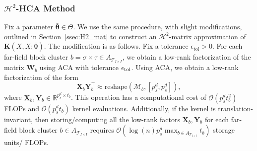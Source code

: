 \documentclass[final,3p,times]{elsarticle}
\newcommand{\mc}[1]{\mathcal{#1}}
\renewcommand{\vec}[1]{\boldsymbol{#1}}
\newcommand{\mat}[1]{\boldsymbol{#1}}
\newcommand{\R}{\mathbb{R}}
\newcommand{\ten}[1]{\boldsymbol{\mathcal{#1}}}
\begin{document}
\subsubsection{\texorpdfstring{$\mc{H}^{2}$}{}-HCA Method}\label{sssec:H2-ACA}
Fix a parameter $\bar{\vec{\theta}} \in \Theta$. We use the same procedure, with slight modifications,  outlined in Section~\ref{ssec:H2_mat} to construct an $\mc{H}^{2}$-matrix approximation of $\mat{K}(X, X;\bar{\vec{\theta}})$. The modification is as follows. Fix a tolerance $\epsilon_{\text{tol}} > 0$. For each far-field block cluster $b = \sigma \times \tau \in A_{\mc{T}_{I \times I}}$,  we obtain a low-rank factorization of the matrix $\mat{W}_{b}$ using ACA with tolerance $\epsilon_{\rm{tol}}$. Using ACA, we obtain a low-rank factorization of the form
$$\mat{X}_{b}\mat{Y}_{b}^{\top} \approx  \text{reshape}(\ten{M}_{b}, [p_s^d, p_s^d]),$$
where $\mat{X}_{b}, \mat{Y}_{b} \in \R^{p_s^d \times t_b}$. This operation has a computational cost of  
  $\mc{O}(p_s^dt_b^2)$ FLOPs and $\mc{O}(p_s^dt_b)$ kernel evaluations. Additionally, if the kernel is translation-invariant, then storing/computing all the low-rank factors $\mat{X}_{b}, \mat{Y}_{b}$ for each far-field block cluster $b \in A_{\mc{T}_{I \times I}} $ requires  $\mc{O}(\log(n)p_s^d\max_{b \in A_{\mc{T}_{I \times I}}}t_{b})$ storage units/ FLOPs.
\end{document}
